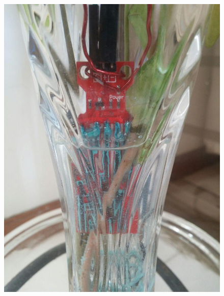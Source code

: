 \begin{itemize}
\begin{figure}[!htb]
\centering
\includegraphics[scale=0.11]{./Figuras/sensor_agua.jpg}

\end{figure}
\end{itemize}
